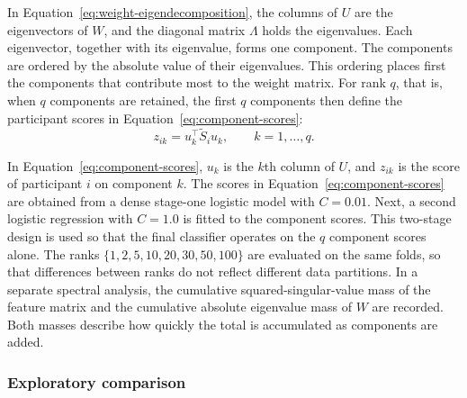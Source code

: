 In Equation~\eqref{eq:weight-eigendecomposition}, the columns of $U$ are the eigenvectors of $W$, and the diagonal
matrix $\Lambda$ holds the eigenvalues. Each eigenvector, together with its eigenvalue,
forms one component. The components are ordered by the absolute value of their eigenvalues.
This ordering places first the components that contribute most to the weight matrix. For
rank $q$, that is, when $q$ components are retained, the first $q$ components then define
the participant scores in Equation~\eqref{eq:component-scores}:
\begin{equation}
z_{ik}
=
u_k^\top \widetilde{S}_i u_k,
\qquad k=1,\ldots,q.
\label{eq:component-scores}
\end{equation}

In Equation~\eqref{eq:component-scores}, $u_k$ is the $k$th column of $U$, and $z_{ik}$ is the score of
participant $i$ on component $k$. The scores in Equation~\eqref{eq:component-scores} are obtained from a
dense stage-one logistic model with $C=0.01$. Next, a second logistic regression with
$C=1.0$ is fitted to the component scores. This two-stage design is used so that the final
classifier operates on the $q$ component scores alone. The ranks $\{1,2,5,10,20,30,50,100\}$
are evaluated on the same folds, so that differences between ranks do not reflect different
data partitions. In a separate spectral analysis, the cumulative squared-singular-value mass
of the feature matrix and the cumulative absolute eigenvalue mass of $W$ are recorded. Both
masses describe how quickly the total is accumulated as components are added.

\subsubsection{Exploratory comparison}
\label{subsubsec:exploratory-comparisons}

